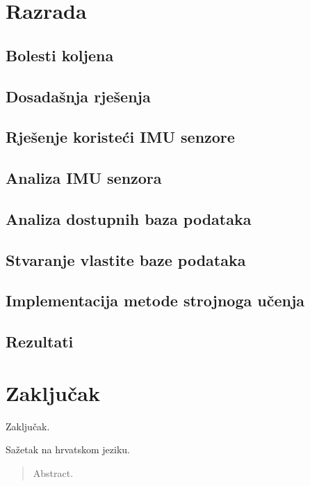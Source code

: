 \documentclass[times, utf8, diplomski]{fer}
\begin{document}
\chapter{Razrada}

\section{Bolesti koljena}

\section{Dosadašnja rješenja}

\section{Rješenje koristeći IMU senzore}

\section{Analiza IMU senzora}

\section{Analiza dostupnih baza podataka}

\section{Stvaranje vlastite baze podataka}

\section{Implementacija metode strojnoga učenja}

\section{Rezultati}

\chapter{Zaključak}
Zaključak.




\begin{sazetak}
Sažetak na hrvatskom jeziku.

\end{sazetak}

\begin{abstract}
Abstract.

\end{abstract}
\end{document}

